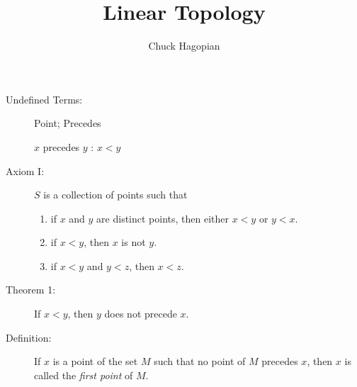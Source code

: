 \documentclass{article}
\let\titlepageAuthor\author
\renewcommand{\author}[1]{\newcommand{\headerAuthor}{#1}\titlepageAuthor{#1}}
\let\titlepageTitle\title
\renewcommand{\title}[1]{\newcommand{\headerTitle}{#1}\titlepageTitle{#1}}
\begin{document}
\title{Linear Topology}
\author{Chuck Hagopian}
\date{}
\maketitle
\thispagestyle{empty}

\newpage


\begin{description}
  \item[Undefined Terms:] Point; Precedes

      $x$ precedes $y$ : $x<y$
  \item[Axiom I:] $S$ is a collection of points such that 
    \begin{enumerate}[\hspace{1cm}(a)]
      \item if $x$ and $y$ are distinct points, then either $x<y$ or $y<x$.
      \item if $x<y$, then $x$ is not $y$.
      \item if $x<y$ and $y<z$, then $x<z$.
    \end{enumerate}
  \item[Theorem 1:] If $x<y$, then $y$ does not precede $x$.
  \item[Definition:] If $x$ is a point of the set $M$ such that no point of $M$ precedes $x$, then $x$ is called the \emph{first point} of $M$.


\end{description}
\end{document}

